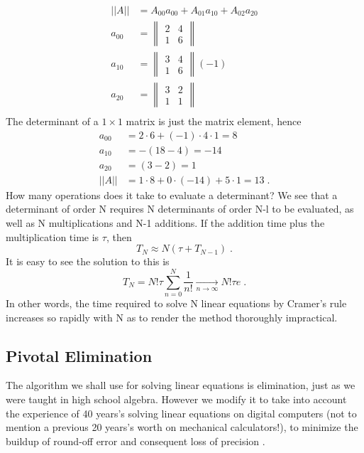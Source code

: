 \begin{align*}
    ||A||&=A_{00}a_{00}+A_{01}a_{10}+   A_{02}a_{20}\\
    a_{00} &= 
    \begin{Vmatrix}
        2 & 4\\
        1 & 6
    \end{Vmatrix}\\
    a_{10} &= 
    \begin{Vmatrix}
        3 & 4\\
        1 & 6
    \end{Vmatrix} (-1)\\
    a_{20} &= 
    \begin{Vmatrix}
        3 & 2\\
        1 & 1
    \end{Vmatrix}\\
\end{align*}
The determinant of a $1 \times 1$ matrix is just the matrix element, hence
\begin{align*}
    a_{00} &=  2 \cdot 6 + (-1)\cdot 4\cdot 1 = 8\\
    a_{10} &=  -(18 - 4) = -14\\
    a_{20} &=  (3 -2) = 1\\
    ||A||&= 1\cdot 8 + 0\cdot (-14)+ 5\cdot 1 =13\;.
\end{align*}
How many operations does it take to evaluate a determinant? We
see that a determinant of order N requires N determinants of
order N-l to be evaluated, as well as N multiplications and N-1
additions. If the addition time plus the multiplication time is $\tau$,
then
\begin{equation*}
    T_N\approx N(\tau +T_{N-1})\;.
\end{equation*}
It is easy to see the solution to this is
\begin{equation*}
    T_N =N!\tau \sum_{n=0}^{N}\frac{1}{n!} \underset{n\to\infty}{\rightarrow} N!\tau e\;.
\end{equation*}
In other words, the time required to solve N linear equations by
Cramer's rule increases so rapidly with N as to render the method
thoroughly impractical.

\subsection{Pivotal Elimination}
The algorithm we shall use for solving linear equations is elimination, just as we were taught in high school algebra. However we
modify it to take into account the experience of 40 years's solving
linear equations on digital computers (not to mention a previous
20 years's worth on mechanical calculators!), to minimize the
buildup of round-off error and consequent loss of precision .

